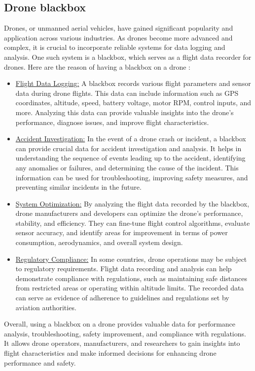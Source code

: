 \subsection{Drone blackbox}
Drones, or unmanned aerial vehicles, have gained significant popularity and application across various industries. As drones become more advanced and complex, it is crucial to incorporate reliable systems for data logging and analysis. One such system is a blackbox, which serves as a flight data recorder for drones. Here are the reason of having a blackbox on a drone :
\begin{itemize}
    \item \underline{Flight Data Logging:} A blackbox records various flight parameters and sensor data during drone flights. This data can include information such as GPS coordinates, altitude, speed, battery voltage, motor RPM, control inputs, and more. Analyzing this data can provide valuable insights into the drone's performance, diagnose issues, and improve flight characteristics.
    \item \underline{Accident Investigation:} In the event of a drone crash or incident, a blackbox can provide crucial data for accident investigation and analysis. It helps in understanding the sequence of events leading up to the accident, identifying any anomalies or failures, and determining the cause of the incident. This information can be used for troubleshooting, improving safety measures, and preventing similar incidents in the future.
    \item \underline{System Optimization:} By analyzing the flight data recorded by the blackbox, drone manufacturers and developers can optimize the drone's performance, stability, and efficiency. They can fine-tune flight control algorithms, evaluate sensor accuracy, and identify areas for improvement in terms of power consumption, aerodynamics, and overall system design.
    \item \underline{Regulatory Compliance:} In some countries, drone operations may be subject to regulatory requirements. Flight data recording and analysis can help demonstrate compliance with regulations, such as maintaining safe distances from restricted areas or operating within altitude limits. The recorded data can serve as evidence of adherence to guidelines and regulations set by aviation authorities.
\end{itemize}
\hfill \break
Overall, using a blackbox on a drone provides valuable data for performance analysis, troubleshooting, safety improvement, and compliance with regulations. It allows drone operators, manufacturers, and researchers to gain insights into flight characteristics and make informed decisions for enhancing drone performance and safety.


